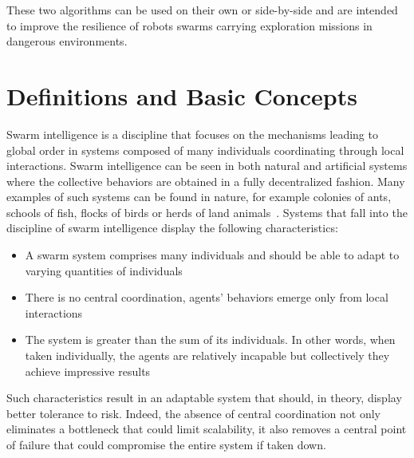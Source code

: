 
These two algorithms can be used on their own or side-by-side and are intended to improve the resilience of robots swarms carrying exploration missions in dangerous environments.


\section{Definitions and Basic Concepts}
\label{sec:Introduction:basic} 

Swarm intelligence is a discipline that focuses on the mechanisms leading to global order in systems composed of many individuals coordinating through local interactions. Swarm intelligence can be seen in both natural and artificial systems where the collective behaviors are obtained in a fully decentralized fashion. Many examples of such systems can be found in nature, for example colonies of ants, schools of fish, flocks of birds or herds of land animals~\cite{Dorigo:2007}. Systems that fall into the discipline of swarm intelligence display the following characteristics: 

\begin{itemize}
    \item A swarm system comprises many individuals and should be able to adapt to varying quantities of individuals
    \item There is no central coordination, agents' behaviors emerge only from local interactions
    \item The system is greater than the sum of its individuals. In other words, when taken individually, the agents are relatively incapable but collectively they achieve impressive results
\end{itemize}

Such characteristics result in an adaptable system that should, in theory, display better tolerance to risk. Indeed, the absence of central coordination not only eliminates a bottleneck that could limit scalability, it also removes a central point of failure that could compromise the entire system if taken down.

